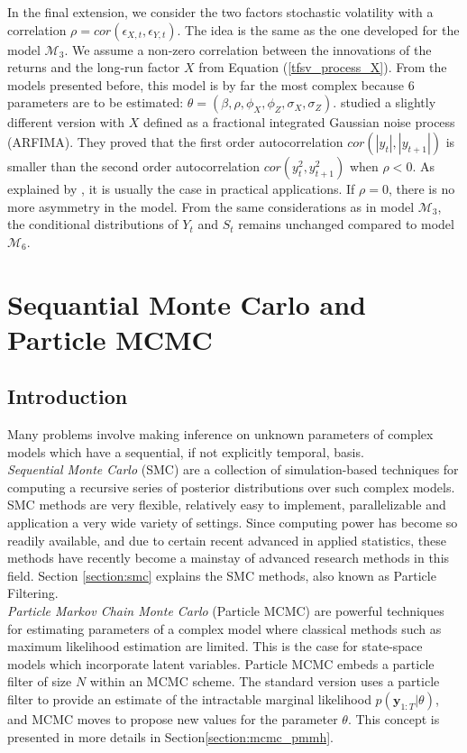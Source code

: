 \documentclass[11pt,a4,twosided,singlespacing,titlepagenumber=on]{scrreprt}
\numberwithin{equation}{chapter} %
\theoremstyle{remark}
\newcommand{\matr}[1]{\mathbf{#1}}
\begin{document}
In the final extension, we consider the two factors stochastic volatility with a correlation $\rho = cor(\epsilon_{X,t}, \epsilon_{Y,t})$. The idea is the same as the one developed for the model $\mathcal{M}_3$. We assume a non-zero correlation between the innovations of the returns and the long-run factor $X$ from Equation (\ref{tfsv_process_X}). From the models presented before, this model is by far the most complex because 6 parameters are to be estimated: $\theta = (\beta, \rho, \phi_X, \phi_Z, \sigma_X, \sigma_Z)$. \cite{ruiz2008} studied a slightly different version with $X$ defined as a fractional integrated Gaussian noise process (ARFIMA). They proved that the first order autocorrelation $cor(|y_t|,|y_{t+1}|)$ is smaller than the second order autocorrelation $cor(y_t^2,y_{t+1}^2)$ when $\rho < 0$. As explained by \cite{cont2005}, it is usually the case in practical applications. If $\rho = 0$, there is no more asymmetry in the model. From the same considerations as in model $\mathcal{M}_3$, the conditional distributions of $Y_t$ and $S_t$ remains unchanged compared to model $\mathcal{M}_6$.

\chapter{Sequantial Monte Carlo and Particle MCMC}
\label{section:pmcmc}
\section{Introduction}
Many problems involve making inference on unknown parameters of complex models which have a sequential, if not explicitly temporal, basis. \\

\textit{Sequential Monte Carlo} (SMC) are a collection of simulation-based techniques for computing a recursive series of posterior distributions over such complex models. SMC methods are very flexible, relatively easy to implement, parallelizable and application a very wide variety of settings. Since computing power has become so readily available, and due to certain recent advanced in applied statistics, these methods have recently become a mainstay of advanced research methods in this field. Section \ref{section:smc} explains the SMC methods, also known as Particle Filtering. \\

\textit{Particle Markov Chain Monte Carlo} (Particle MCMC) are powerful techniques for estimating parameters of a complex model where classical methods such as maximum likelihood estimation are limited. This is the case for state-space models which incorporate latent variables. Particle MCMC embeds a particle filter of size $N$ within an MCMC scheme. The standard version uses a particle filter to provide an estimate of the intractable marginal likelihood $p(\matr{y}_{1:T}|\theta)$, and MCMC moves to propose new values for the parameter $\theta$. This concept is presented in more details in Section\ref{section:mcmc_pmmh}.
\end{document}
